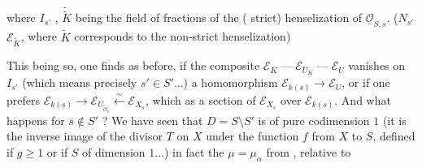 where $I_{s'}$  , $\widetilde{\widetilde K}$ being the field of fractions of the ( strict) henselization of $\underline{\mathcal O}_{S,s}$. ($N_{s'}$   $\mathcal E_{\widetilde K}$, where $\widetilde K$ corresponds to the non-strict henselization)

This being so, one finds as before, if the composite  $\mathcal E_K\mathrel{\text{---}}\mathcal E_{U_K}\mathrel{\text{---}}\mathcal E_U$ vanishes on $I_{s'}$   (which means precisely  $s'\in S'\ldots$)  a homomorphism $\mathcal E_{k(s)}\longrightarrow\mathcal E_U$, or if one prefers $\mathcal E_{k(s)}\longrightarrow\mathcal E_{U_{\widetilde{\mathcal O}_s}}\xleftarrow{\sim}\mathcal E_{X_s}$, which    as a section of $\mathcal E_{X_s}$ over $\mathcal E_{k(s)}$. And what happens for $s\notin S'$ ?  We have seen that $D=S\setminus S'$ is of pure codimension $1$ (it is the inverse image of the divisor $T$ on $X$ under the function $f$ from $X$ to $S$, defined if $g\geq1$ or if $S$ of dimension $1\ldots$) in fact the $\mu=\mu_\alpha$ from , relative to
